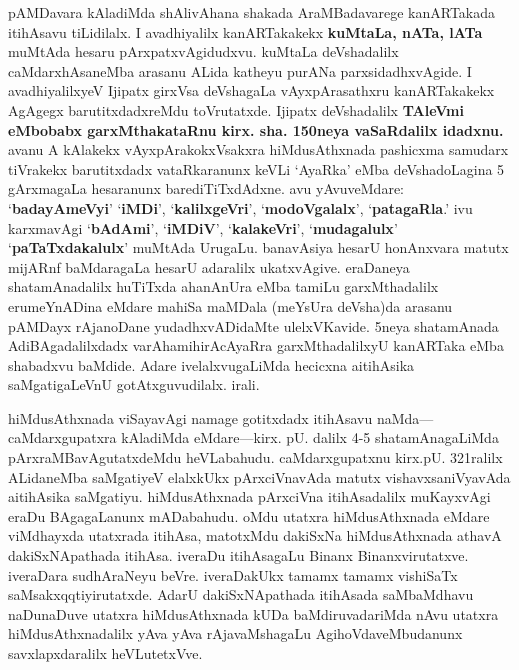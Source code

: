 \documentclass[11pt,a4size]{article}
\begin{document}
pAMDavara kAladiMda shAlivAhana shakada AraMBadavarege kanARTakada
itihAsavu tiLidilalx. I avadhiyalilx kanARTakakekx \textbf{kuMtaLa,
  nATa, lATa} muMtAda hesaru pArxpatxvAgidudxvu. kuMtaLa deVshadalilx
caMdarxhAsaneMba arasanu ALida katheyu purANa parxsidadhxvAgide. I
avadhiyalilxyeV Ijipatx girxVsa deVshagaLa vAyxpArasathxru
kanARTakakekx AgAgegx barutitxdadxreMdu toVrutatxde. Ijipatx
deVshadalilx \textbf{TAleVmi eMbobabx garxMthakataRnu
  kirx. sha. 150neya vaSaRdalilx idadxnu.} avanu A kAlakekx
vAyxpArakokxVsakxra hiMdusAthxnada pashicxma samudarx tiVrakekx
barutitxdadx vataRkaranunx keVLi `AyaRka' eMba deVshadoLagina 5
gArxmagaLa hesaranunx barediTiTxdAdxne. avu yAvuveMdare: `\textbf{badayAmeVyi}'
`\textbf{iMDi}', `\textbf{kalilxgeVri}', `\textbf{modoVgalalx}', 
`\textbf{patagaRla}.' ivu karxmavAgi
`\textbf{bAdAmi}', `\textbf{iMDiV}', `\textbf{kalakeVri}', `\textbf{mudagalulx}' 
`\textbf{paTaTxdakalulx}' muMtAda
UrugaLu. banavAsiya hesarU honAnxvara matutx mijARnf baMdaragaLa
hesarU adaralilx ukatxvAgive. eraDaneya shatamAnadalilx huTiTxda
ahanAnUra eMba tamiLu garxMthadalilx erumeYnADina eMdare mahiSa
maMDala (meYsUra deVsha)da arasanu pAMDayx rAjanoDane yudadhxvADidaMte
ulelxVKavide. 5neya shatamAnada AdiBAgadalilxdadx varAhamihirAcAyaRra
garxMthadalilxyU kanARTaka eMba shabadxvu baMdide. Adare
ivelalxvugaLiMda hecicxna aitihAsika saMgatigaLeVnU
gotAtxguvudilalx. irali.

hiMdusAthxnada viSayavAgi namage gotitxdadx itihAsavu
naMda---caMdarxgupatxra kAladiMda eMdare---kirx. pU. dalilx 4-5
shatamAnagaLiMda pArxraMBavAgutatxdeMdu heVLabahudu. caMdarxgupatxnu
kirx.pU. 321ralilx ALidaneMba saMgatiyeV elalxkUkx pArxciVnavAda
matutx vishavxsaniVyavAda aitihAsika saMgatiyu. hiMdusAthxnada
pArxciVna itihAsadalilx muKayxvAgi eraDu BAgagaLanunx mADabahudu. oMdu
utatxra hiMdusAthxnada eMdare viMdhayxda utatxrada itihAsa, matotxMdu
dakiSxNa hiMdusAthxnada athavA dakiSxNApathada itihAsa. iveraDu
itihAsagaLu Binanx Binanxvirutatxve. iveraDara sudhAraNeyu
beVre. iveraDakUkx tamamx tamamx vishiSaTx
saMsakxqqtiyirutatxde. AdarU dakiSxNApathada itihAsada saMbaMdhavu
naDunaDuve utatxra hiMdusAthxnada kUDa baMdiruvadariMda nAvu utatxra
hiMdusAthxnadalilx yAva yAva rAjavaMshagaLu AgihoVdaveMbudanunx
savxlapxdaralilx heVLutetxVve.
\end{document}
